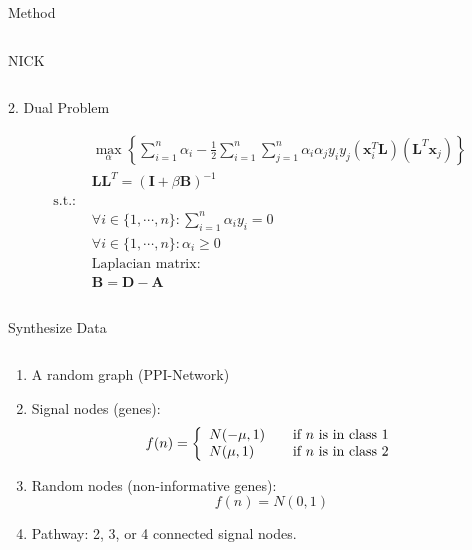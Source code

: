 \documentclass[final]{beamer} %
\newcommand{\mycite}[1]{\begin{textblock*}{4cm}(8.7cm,8.6cm)
    \begin{beamercolorbox}[ht=0.5cm,right]{framesource}
        \usebeamerfont{framesource}\usebeamercolor[fg]{framesource} {#1}
    \end{beamercolorbox}
\end{textblock*}}
\begin{document}
\begin{frame}{}
\begin{block}{Method}
\begin{columns}
\begin{column}{0.3\textwidth}
\begin{block}{NICK}
\begin{columns}
            \begin{column}{0.5\textwidth}
              \begin{block}{\tiny{2. Dual Problem}}
                \tiny
                \begin{center}
                  \begin{align*}
                    &\max_\alpha\left\{\sum_{i=1}^n\alpha_i-\frac{1}{2}\sum_{i=1}^n\sum_{j=1}^n\alpha_i\alpha_j y_i y_j (\mathbf{x}_i^T\mathbf{L})(\mathbf{L}^T\mathbf{x}_j)\right\}\\
                    &\mathbf{L}\mathbf{L}^T=(\mathbf{I}+\beta \mathbf{B})^{-1}\\
                    \text{s.t.: }&\\
                    &\forall i \in \{1,\cdots,n\}: \sum_{i=1}^n\alpha_iy_i=0\\
                    &\forall i \in \{1,\cdots,n\}: \alpha_i \geq 0 \\
                    &\text{Laplacian matrix:}\\  & \mathbf{B} = \mathbf{D} - \mathbf{A}
                  \end{align*}
                \end{center}
              \end{block}
            \end{column}
          \end{columns}
        \end{block}
      \end{column}
    \end{columns}
  \end{block}

    \begin{block}{Synthesize Data}
      \begin{columns}
        \begin{column}{0.3\textwidth}
          \begin{enumerate}
          \item A random graph (PPI-Network)
          \item Signal nodes (genes): \[ f(n) = \left\{ 
            \begin{array}{l l}
              N(-\mu, 1) & \quad \text{if $n$ is in class $1$}\\
              N(\mu, 1) & \quad \text{if $n$ is in class $2$}
            \end{array} \right.\]
          \item Random nodes (non-informative genes): \[f(n) = N(0, 1) \]
          \item Pathway: 2, 3, or 4 connected signal nodes.
          \end{enumerate}
        \end{column}


\end{columns}
\end{block}
\end{frame}
\end{document}

